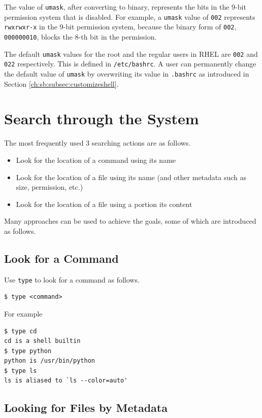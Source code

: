 The value of \verb|umask|, after converting to binary, represents the bits in the 9-bit permission system that is disabled. For example, a \verb|umask| value of \verb|002| represents \verb|rwxrwxr-x| in the 9-bit permission system, because the binary form of \verb|002|, \verb|000000010|, blocks the $8$-th bit in the permission.

The default \verb|umask| values for the root and the regular users in RHEL are \verb|002| and \verb|022| respectively. This is defined in \verb|/etc/bashrc|. A user can permanently change the default value of \verb|umask| by overwriting its value in \verb|.bashrc| as introduced in Section \ref{ch:sb:subsec:customizeshell}.

\section{Search through the System}

The most frequently used 3 searching actions are as follows.
\begin{itemize}
  \item Look for the location of a command using its name
  \item Look for the location of a file using its name (and other metadata such as size, permission, etc.)
  \item Look for the location of a file using a portion its content
\end{itemize}

Many approaches can be used to achieve the goals, some of which are introduced as follows.

\subsection{Look for a Command}

Use \verb|type| to look for a command as follows.
\begin{lstlisting}
$ type <command>
\end{lstlisting}

For example
\begin{lstlisting}
$ type cd
cd is a shell builtin
$ type python
python is /usr/bin/python
$ type ls
ls is aliased to `ls --color=auto'
\end{lstlisting}

\subsection{Looking for Files by Metadata}

